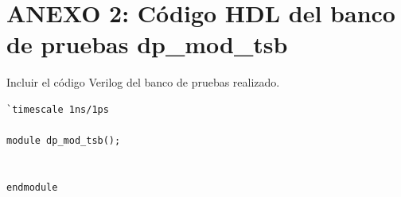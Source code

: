 \documentclass[parskip,a4paper,12pt]{article}
\begin{document}


\section{ANEXO 2: Código HDL del banco de pruebas dp\_mod\_tsb}
\begin{enunciado}{}{}%
Incluir el código Verilog del banco de pruebas realizado.
\end{enunciado}

\begin{verbatim}
`timescale 1ns/1ps

module dp_mod_tsb();


endmodule 


\end{verbatim}

\end{document}
